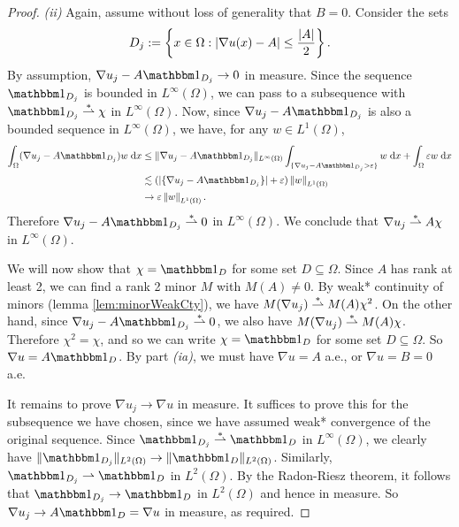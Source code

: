 \begin{proof}
    \textit{(ii)} Again, assume without loss of generality that $B = 0$. Consider the sets 
    \begin{equation}
        D_j := \left\{ { x \in \Omega : \left\lvert {\nabla u(x) - A} \right\rvert \leq \frac{\left\lvert {A} \right\rvert}{2} } \right\}.
    \end{equation}
    By assumption, $\nabla u_j - A \bbone_{D_j} \to 0$ in measure. Since the sequence $\bbone_{D_j}$ is bounded in $L^\infty(\Omega)$, we can pass to a subsequence with $\bbone_{D_j} \weakstar \chi$ in $L^\infty(\Omega)$. Now, since $\nabla u_j - A \bbone_{D_j}$ is also a bounded sequence in $L^\infty(\Omega)$, we have, for any $w \in L^1(\Omega)$,
    \begin{equation} \begin{aligned}
        \int_\Omega (\nabla u_j - A \bbone_{D_j}) w \; \d{x} 
        &\leq \fhnorm{ \nabla u_j - A \bbone_{D_j} }_{L^\infty(\Omega)} \int_{\fhset{ \nabla u_j - A \bbone_{D_j} > \epsilon }} w \; \d{x} 
               + \int_\Omega \epsilon w \; \d{x} \\
        &\lesssim ( \fhabs{ \fhset{ \nabla u_j - A \bbone_{D_j} } } + \epsilon ) \norm{w}_{L^1(\Omega)} \\
        &\to \epsilon \norm{w}_{L^1(\Omega)}.
    \end{aligned} \end{equation}
    Therefore $\nabla u_j - A \bbone_{D_j} \weakstar 0$ in $L^\infty(\Omega)$. We conclude that $\nabla u_j \overset{\ast}{\rightharpoonup} A \chi$ in $L^\infty(\Omega)$. 
    
    We will now show that $\chi = \bbone_D$ for some set $D \subseteq \Omega$. Since $A$ has rank at least 2, we can find a rank 2 minor $M$ with $M(A) \neq 0$. By weak* continuity of minors (lemma \ref{lem:minorWeakCty}), we have $M(\nabla u_j) \overset{\ast}{\rightharpoonup} M(A) \chi^2$. On the other hand, since $\nabla u_j - A \bbone_{D_j} \weakstar 0$, we also have $M(\nabla u_j) \overset{\ast}{\rightharpoonup} M(A) \chi$. Therefore $\chi^2 = \chi$, and so we can write $\chi = \bbone_D$ for some set $D \subseteq \Omega$. So $\nabla u = A \bbone_D$. By part \textit{(ia)}, we must have $\nabla u = A$ a.e., or $\nabla u = B = 0$ a.e. 

    It remains to prove $\nabla u_j \to \nabla u$ in measure. It suffices to prove this for the subsequence we have chosen, since we have assumed weak* convergence of the original sequence. Since $\bbone_{D_j} \weakstar \bbone_D$ in $L^\infty(\Omega)$, we clearly have $\fhnorm{\bbone_{D_j}}_{L^2(\Omega)} \to \fhnorm{\bbone_{D}}_{L^2(\Omega)}$. Similarly, $\bbone_{D_j} \weak \bbone_D$ in $L^2(\Omega)$. By the Radon-Riesz theorem, it follows that $\bbone_{D_j} \to \bbone_{D}$ in $L^2(\Omega)$ and hence in measure. So $\nabla u_j \to A \bbone_D = \nabla u$ in measure, as required.
\end{proof}

